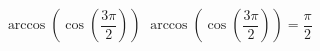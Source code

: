  {$\arccos\left(\cos\left(\dfrac{3\pi}{2}\right) \right)$}
{ $\arccos\left(\cos\left(\dfrac{3\pi}{2}\right) \right) = \dfrac{\pi}{2}$}
